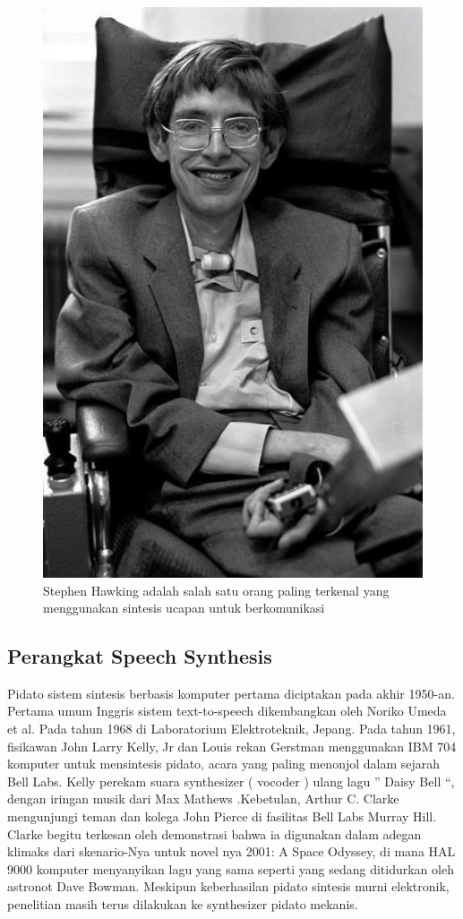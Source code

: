 \begin{figure}[H]
        \centerline{\includegraphics[scale=.45]{figures/stephan}}
        \caption{Stephen Hawking adalah salah satu orang paling terkenal yang menggunakan sintesis ucapan untuk berkomunikasi}
		\label{stephan}
\end{figure}

\subsection{Perangkat Speech Synthesis}
Pidato sistem sintesis berbasis komputer pertama diciptakan pada akhir 1950-an. Pertama umum Inggris sistem text-to-speech dikembangkan oleh Noriko Umeda et al. Pada tahun 1968 di Laboratorium Elektroteknik, Jepang. Pada tahun 1961, fisikawan John Larry Kelly, Jr dan Louis rekan Gerstman menggunakan IBM 704 komputer untuk mensintesis pidato, acara yang paling menonjol dalam sejarah Bell Labs. Kelly perekam suara synthesizer ( vocoder ) ulang lagu ” Daisy Bell “, dengan iringan musik dari Max Mathews .Kebetulan, Arthur C. Clarke mengunjungi teman dan kolega John Pierce di fasilitas Bell Labs Murray Hill. Clarke begitu terkesan oleh demonstrasi bahwa ia digunakan dalam adegan klimaks dari skenario-Nya untuk novel nya 2001: A Space Odyssey, di mana HAL 9000 komputer menyanyikan lagu yang sama seperti yang sedang ditidurkan oleh astronot Dave Bowman. Meskipun keberhasilan pidato sintesis murni elektronik, penelitian masih terus dilakukan ke synthesizer pidato mekanis.

